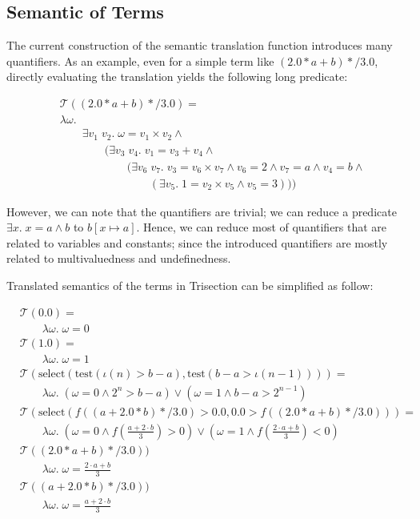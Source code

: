 \documentclass{article}
\newcommand{\select}{\text{select}}
\newcommand{\test}[1]{\text{test}(#1)}
\newcommand{\trans}[1]{\mathcal{T}( #1) }
\begin{document}
\subsection{Semantic of Terms}
\label{ss:semterm}
The current construction of the semantic translation function introduces many quantifiers.
As an example, even for a simple term like $(2.0*a+b)*/3.0$,
directly evaluating the translation yields the following long predicate:

\begin{align*}
&\trans{(2.0*a+b)*/3.0} =\\
&\lambda \omega.\; \\
&\qquad\exists v_1\; v_2. \;\omega =v_1  \times v_2  \land \\
&\qquad\qquad (\exists v_3 \; v_4.\; v_1 =v_3 + v_4 \land \\
&\qquad\qquad\qquad(\exists v_6 \; v_7.\; v_3=v_6  \times v_7  \land v_6 =2 \land v_7 =a \land v_4 =b \land \\
&\qquad\qquad\qquad\qquad(\exists v_5.\; 
1 = v_2  \times v_5  \land v_5 =3)))
\end{align*}

However, we can note that the quantifiers are trivial; 
we can reduce a predicate $\exists x.\; x=a\land b$
to $b[x\mapsto a]$. Hence, we can reduce most of quantifiers that are related to variables and constants;
since the introduced quantifiers are mostly related to multivaluedness and undefinedness.

Translated semantics of the terms in Trisection can be simplified as follow:

\begin{align*}
&\trans{0.0} =\\
&\qquad \lambda \omega.\; \omega = 0 \\
&\trans{1.0} = \\
&\qquad\lambda \omega.\; \omega = 1\\
&\trans{\select(\test{\iota(n) > b - a}, \test{b - a > \iota(n-1)})} = \\
&\qquad\lambda\omega.\; 
(\omega = 0\land 2^n > b - a) \lor (\omega = 1 \land b-a> 2^{n-1}) \\
&\trans{\select(f((a+2.0*b)*/3.0)>0.0, 0.0>f((2.0*a+b)*/3.0))} = \\
&\qquad\lambda\omega.\; 
\left(\omega=0\land f\left(\frac{a+2\cdot b}{3}\right) > 0\right) \lor
\left(\omega=1\land f\left(\frac{2\cdot a+ b}{3}\right) < 0\right) \\
&\trans{(2.0*a+b)*/3.0)} \\
&\qquad\lambda\omega.\; 
\omega = \frac{2\cdot a+b}{3}\\
&\trans{(a+2.0*b)*/3.0)} \\
&\qquad\lambda\omega.\; 
\omega = \frac{a+2\cdot b}{3}
\end{align*}
\end{document}
